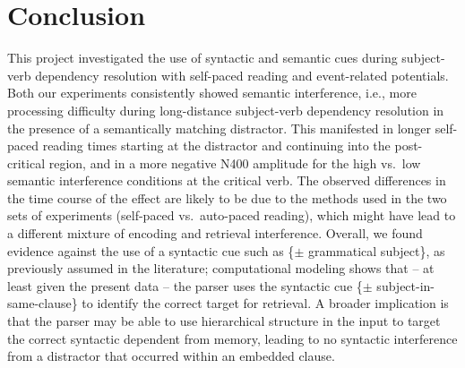 \documentclass[a4paper, man, floatsintext]{apa7}
\begin{document}
\section{Conclusion}
This project investigated the use of  syntactic and semantic cues during subject-verb dependency resolution with self-paced reading and event-related potentials.  Both our experiments consistently showed semantic interference, i.e., more processing difficulty during long-distance subject-verb dependency resolution in the presence of a semantically matching distractor. This manifested in longer self-paced reading times starting at the distractor and continuing into the post-critical region, and in a more negative N400 amplitude for the high vs.\ low semantic interference conditions at the critical verb. The observed differences in the time course of the effect are likely to be due to the methods used in the two sets of experiments (self-paced vs.\ auto-paced reading), which might have lead to a different mixture of encoding and retrieval interference. Overall, we found evidence against the use of a syntactic cue such as \{$\pm$ grammatical subject\}, as previously assumed in the literature; computational modeling shows that -- at least given the present data -- the parser uses the syntactic cue  \{$\pm$ subject-in-same-clause\}  to identify the correct target for retrieval.  A broader implication is that the parser may be able to use hierarchical structure in the input to target the correct syntactic dependent from memory, leading to no syntactic interference from a distractor that occurred within an embedded clause.

\newpage
\printbibliography
\end{document}
